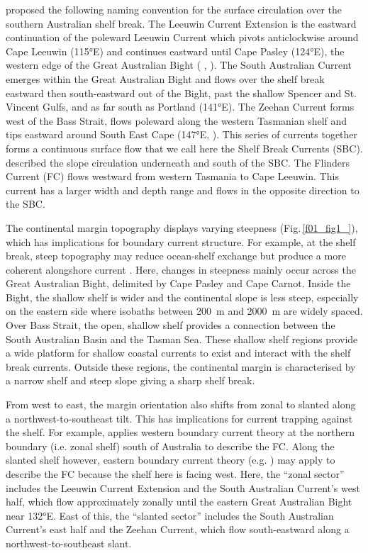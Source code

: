 \documentclass[preprint,3p,review,12pt]{elsarticle}
\begin{document}
\citet{Ridgway2004} proposed the following naming convention for the surface circulation over the southern Australian shelf break.
The Leeuwin Current Extension is the eastward continuation of the poleward Leeuwin Current which pivots anticlockwise around Cape Leeuwin (\ang{115}E) and continues eastward until Cape Pasley (\ang{124}E), the western edge of the Great Australian Bight (\citeauthor{Ridgway2004} \citeyear{Ridgway2004}, \citeauthor{Batteen2007} \citeyear{Batteen2007}).
The South Australian Current emerges within the Great Australian Bight and flows over the shelf break eastward then south-eastward out of the Bight, past the shallow Spencer and St.\,Vincent Gulfs, and as far south as Portland (\ang{141}E).
The Zeehan Current forms west of the Bass Strait, flows poleward along the western Tasmanian shelf and tips eastward around South East Cape (\ang{147}E, \citeauthor{Oliver2018b} \citeyear{Oliver2018b}).
This series of currents together forms a continuous surface flow that we call here the Shelf Break Currents (SBC).
\citet{Middleton2002} described the slope circulation underneath and south of the SBC. The Flinders Current (FC) flows westward from western Tasmania to Cape Leeuwin. This current has a larger width and depth range and flows in the opposite direction to the SBC.

The continental margin topography displays varying steepness (Fig.\,\ref{f01_fig1_}), which has implications for boundary current structure.
For example, at the shelf break, steep topography may reduce ocean-shelf exchange \citep{Huthnance1995} but produce a more coherent alongshore current \citep{Pennel2012}.
Here, changes in steepness mainly occur across the Great Australian Bight, delimited by Cape Pasley and Cape Carnot. Inside the Bight, the shallow shelf is wider and the continental slope is less steep, especially on the eastern side where isobaths between \SI{200}{\meter} and \SI{2000}{\meter} are widely spaced. Over Bass Strait, the open, shallow shelf provides a connection between the South Australian Basin and the Tasman Sea. These shallow shelf regions provide a wide platform for shallow coastal currents to exist and interact with the shelf break currents. Outside these regions, the continental margin is characterised by a narrow shelf and steep slope giving a sharp shelf break. 

From west to east, the margin orientation also shifts from zonal to slanted along a northwest-to-southeast tilt. This has implications for current trapping against the shelf. For example, \citet{Middleton2002} applies western boundary current theory at the northern boundary (i.e. zonal shelf) south of Australia to describe the FC. Along the slanted shelf however, eastern boundary current theory (e.g. \citeauthor{McCreary1993}  \citeyear{McCreary1993}) may apply to describe the FC because the shelf here is facing west. Here, the ``zonal sector'' includes the Leeuwin Current Extension and the South Australian Current's west half, which flow approximately zonally until the eastern Great Australian Bight near \ang{132}E. East of this, the ``slanted sector'' includes the South Australian Current's east half and the Zeehan Current, which flow south-eastward along a northwest-to-southeast slant.
\end{document}

